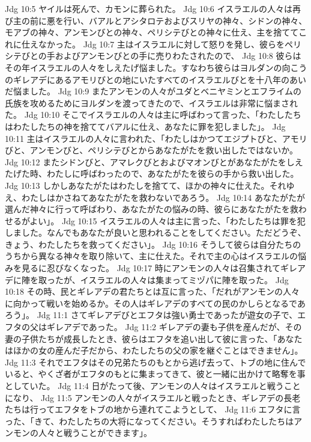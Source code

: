 Jdg 10:5  ヤイルは死んで、カモンに葬られた。
Jdg 10:6  イスラエルの人々は再び主の前に悪を行い、バアルとアシタロテおよびスリヤの神々、シドンの神々、モアブの神々、アンモンびとの神々、ペリシテびとの神々に仕え、主を捨ててこれに仕えなかった。
Jdg 10:7  主はイスラエルに対して怒りを発し、彼らをペリシテびとの手およびアンモンびとの手に売りわたされたので、
Jdg 10:8  彼らはその年イスラエルの人々をしえたげ悩ました。すなわち彼らはヨルダンの向こうのギレアデにあるアモリびとの地にいたすべてのイスラエルびとを十八年のあいだ悩ました。
Jdg 10:9  またアンモンの人々がユダとベニヤミンとエフライムの氏族を攻めるためにヨルダンを渡ってきたので、イスラエルは非常に悩まされた。
Jdg 10:10  そこでイスラエルの人々は主に呼ばわって言った、「わたしたちはわたしたちの神を捨ててバアルに仕え、あなたに罪を犯しました」。
Jdg 10:11  主はイスラエルの人々に言われた、「わたしはかつてエジプトびと、アモリびと、アンモンびと、ペリシテびとからあなたがたを救い出したではないか。
Jdg 10:12  またシドンびと、アマレクびとおよびマオンびとがあなたがたをしえたげた時、わたしに呼ばわったので、あなたがたを彼らの手から救い出した。
Jdg 10:13  しかしあなたがたはわたしを捨てて、ほかの神々に仕えた。それゆえ、わたしはかさねてあなたがたを救わないであろう。
Jdg 10:14  あなたがたが選んだ神々に行って呼ばわり、あなたがたの悩みの時、彼らにあなたがたを救わせるがよい」。
Jdg 10:15  イスラエルの人々は主に言った、「わたしたちは罪を犯しました。なんでもあなたが良いと思われることをしてください。ただどうぞ、きょう、わたしたちを救ってください」。
Jdg 10:16  そうして彼らは自分たちのうちから異なる神々を取り除いて、主に仕えた。それで主の心はイスラエルの悩みを見るに忍びなくなった。
Jdg 10:17  時にアンモンの人々は召集されてギレアデに陣を取ったが、イスラエルの人々は集まってミヅパに陣を取った。
Jdg 10:18  その時、民とギレアデの君たちとは互に言った、「だれがアンモンの人々に向かって戦いを始めるか。その人はギレアデのすべての民のかしらとなるであろう」。
Jdg 11:1  さてギレアデびとエフタは強い勇士であったが遊女の子で、エフタの父はギレアデであった。
Jdg 11:2  ギレアデの妻も子供を産んだが、その妻の子供たちが成長したとき、彼らはエフタを追い出して彼に言った、「あなたはほかの女の産んだ子だから、わたしたちの父の家を継ぐことはできません」。
Jdg 11:3  それでエフタはその兄弟たちのもとから逃げ去って、トブの地に住んでいると、やくざ者がエフタのもとに集まってきて、彼と一緒に出かけて略奪を事としていた。
Jdg 11:4  日がたって後、アンモンの人々はイスラエルと戦うことになり、
Jdg 11:5  アンモンの人々がイスラエルと戦ったとき、ギレアデの長老たちは行ってエフタをトブの地から連れてこようとして、
Jdg 11:6  エフタに言った、「きて、わたしたちの大将になってください。そうすればわたしたちはアンモンの人々と戦うことができます」。
